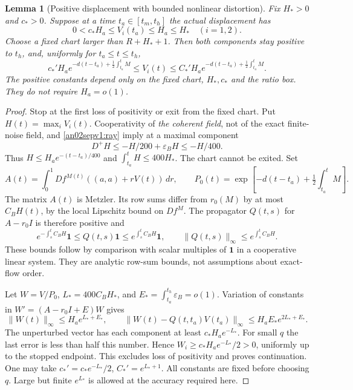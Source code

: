 \documentclass[11pt]{article}
\newtheorem{lemma}[theorem]{Lemma}
\theoremstyle{remark}\newtheorem{remark}[theorem]{Remark}
\newcommand{\dd}{\,d}
\newcommand{\one}{\mathbf1}
\begin{document}
\begin{lemma}[Positive displacement with bounded nonlinear distortion]
\label{an02sepv1:chartlemma}
Fix $H_*>0$ and $c_*>0$. Suppose at a time
$t_a\in[t_m,t_h]$ the actual displacement has
\[
 0<c_* H_a\le V_i(t_a)\le H_a\le H_*\quad(i=1,2).
\]
Choose a fixed chart larger than $R+H_*+1$.
Then both components stay positive to $t_h$, and, uniformly
for $t_a\le t\le t_h$,
\begin{equation}
 c_*'H_a e^{-d(t-t_a)+\frac12\int_{t_a}^tM}
 \le V_i(t)\le
 C_*'H_a e^{-d(t-t_a)+\frac12\int_{t_a}^tM}.
 \label{an02sepv1:charttransport}
\end{equation}
The positive constants depend only on the fixed chart,
$H_*,c_*$ and the ratio box. They do not require $H_a=o(1)$.
\end{lemma}
\begin{proof}
Stop at the first loss of positivity or exit from the fixed
chart. Put $H(t)=\max_i V_i(t)$. Cooperativity of
\emph{the coherent field}, not of the exact finite-noise field,
and \eqref{an02sepv1:ray} imply at a maximal component
\[
 D^+H\le-H/200+\varepsilon_B H\le-H/400.
\]
Thus $H\le H_a e^{-(t-t_a)/400}$ and
$\int_{t_a}^t H\le400H_*$. The chart cannot be exited.
Set
\[
 A(t)=\int_0^1 Df^{M(t)}((a,a)+rV(t))\dd r,\qquad
 P_0(t)=\exp[-d(t-t_a)+\tfrac12\int_{t_a}^t M].
\]
The matrix $A(t)$ is Metzler. Its row sums differ from $r_0(M)$
by at most $C_BH(t)$, by the local Lipschitz bound on $Df^M$.
The propagator $Q(t,s)$ for $A-r_0I$ is therefore positive and
\begin{equation}
 e^{-\int_s^t C_BH}\one\le Q(t,s)\one
       \le e^{\int_s^t C_BH}\one,
 \qquad\|Q(t,s)\|_\infty\le e^{\int_s^t C_BH}.
 \label{an02sepv1:positiveprop}
\end{equation}
These bounds follow by comparison with scalar multiples of
$\one$ in a cooperative linear system. They are analytic
row-sum bounds, not assumptions about exact-flow order.

Let $W=V/P_0$, $L_*=400C_BH_*$, and
$E_* =\int_{t_a}^{t_h}\varepsilon_B=o(1)$.
Variation of constants in $W'=(A-r_0I+E)W$ gives
\[
 \|W(t)\|_\infty\le H_a e^{L_*+E_*},\qquad
 \|W(t)-Q(t,t_a)V(t_a)\|_\infty
       \le H_a E_*e^{2L_*+E_*}.
\]
The unperturbed vector has each component at least
$c_*H_a e^{-L_*}$. For small $q$ the last error is less than
half this number. Hence $W_i\ge c_*H_a e^{-L_*}/2>0$,
uniformly up to the stopped endpoint. This excludes loss of
positivity and proves continuation. One may take
$c_*'=c_*e^{-L_*}/2$, $C_*'=e^{L_*+1}$.
All constants are fixed before choosing $q$. Large but finite
$e^{L_*}$ is allowed at the accuracy required here.
\end{proof}
\end{document}
